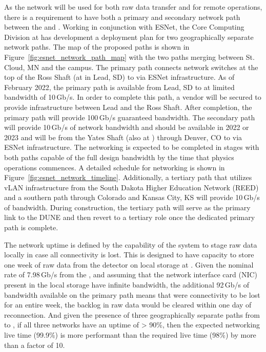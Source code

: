 \documentclass[../main-v1.tex]{subfiles}
\begin{document}
As the network will be used for both raw data transfer and for remote operations, there is a requirement to have both a primary and secondary network path between the  and . Working in conjunction with ESNet, the Core Computing Division at  has development a deployment plan for two geographically separate network paths. The map of the proposed paths is shown in Figure~\ref{fig:esnet_network_path_map} with the two paths merging between St. Cloud, MN and the  campus. The primary path connects network switches at the top of the Ross Shaft (at  in Lead, SD) to  via ESNet infrastructure. As of February 2022, the primary path is available from Lead, SD 
to  at limited bandwidth of 10\,Gb/s. In order to complete this path, a vendor will be secured to provide infrastructure between Lead and the Ross Shaft. After completion, the primary path will provide 100\,Gb/s guaranteed bandwidth. The secondary path will provide 10\,Gb/s of network bandwidth and should be available in %
2022 or 2023 and will be from the Yates Shaft (also at ) through Denver, CO to  via ESNet infrastructure. The networking is expected to be completed in stages with both paths capable of the full design bandwidth by the time that  physics operations commences. A detailed schedule for networking is shown in Figure~\ref{fig:esnet_network_timeline}. Additionally, a tertiary path that utilizes vLAN infrastructure from the South Dakota Higher Education Network (REED) and a southern path through Colorado and Kansas City, KS will provide 10\,Gb/s of bandwidth. During construction, the tertiary path will serve as the primary link to the DUNE  and then revert to a tertiary role once the dedicated primary path is complete.

The network uptime is defined by the capability of the   system to stage raw data locally in case all connectivity is lost. %
This  is designed to have capacity to store one week of raw data from the detector on local storage at . %
Given the nominal rate of 7.98\,Gb/s from the , and assuming that the network interface card (NIC)
present in the local storage have infinite bandwidth, the additional 92\,Gb/s of bandwidth available on the primary path means that 
were connectivity to be lost for an entire week, 
the backlog in raw data would be cleared within one day of reconnection. And given the presence of three geographically separate paths from  to , if all three networks have an uptime of > 90\%, then the expected networking live time (99.9\%) is more performant than the  required live time (98\%) by more than a factor of 10.
\end{document}
